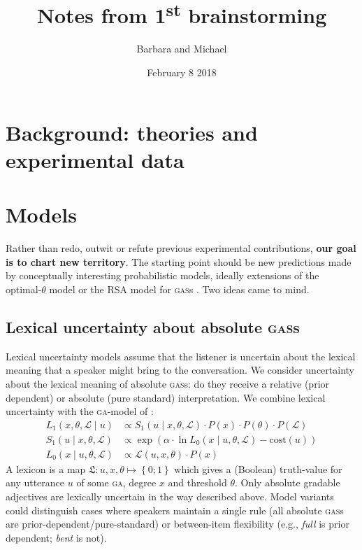 \documentclass[fleqn,reqno,10pt]{article}
\title{Notes from 1\textsuperscript{st} brainstorming}
\author{Barbara and Michael}
\date{February 8 2018}
\newcommand{\acro}[1]{{\relsize{+1}\textsc{#1}}\xspace}
\newcommand{\acros}[1]{{\relsize{+1}\textsc{#1}}{\relsize{-1}s}\xspace}
\newcommand{\ga}{\acro{ga}}    %
\newcommand{\gas}{\acros{gas}} %
\newcommand{\set}[1]{\left\{#1\right\}}
\begin{document}
\maketitle

\section{Background: theories and experimental data}
\label{sec:backgr-theor-exper}

\section{Models}

Rather than redo, outwit or refute previous experimental contributions, \textbf{our goal is to
  chart new territory}. The starting point should be new predictions made by conceptually
interesting probabilistic models, ideally extensions of the optimal-$\theta$ model or the RSA
model for \gas
\citep{QingFranke2014:Meaning-and-Use,QingFranke2014:Gradable-Adject,LassiterGoodman2015:Adjectival-vagu}. Two
ideas came to mind.

\subsection{Lexical uncertainty about absolute \gas}

Lexical uncertainty models
\citep{BergenLevy2012:Thats-what-she-,PottsLassiter2016:Embedded-implic,BergenLevy2014:Pragmatic-Reaso}
assume that the listener is uncertain about the lexical meaning that a speaker might bring to
the conversation. We consider uncertainty about the lexical meaning of absolute \gas: do they
receive a relative (prior dependent) or absolute (pure standard) interpretation. We combine
lexical uncertainty with the \ga-model of \citet{LassiterGoodman2015:Adjectival-vagu}
\citep[exactly what][did too]{TesslerFranke2018:Not-unreasonabl}:
\begin{align}
L_{1}(x, \theta, \mathcal{L} \mid u) &\propto S_{1}(u \mid x, \theta, \mathcal{L}) \cdot P(x) \cdot  P(\theta) \cdot P(\mathcal{L}) \label{eq:L1} \\
S_{1}(u \mid x, \theta, \mathcal{L}) &\propto \exp{(\alpha \cdot \ln {L_{0}(x \mid u, \theta, \mathcal{L})} - \text{cost}(u))} \label{eq:S1}\\
L_{0}(x \mid u, \theta, \mathcal{L}) &\propto \mathcal{L}(u, x, \theta) \cdot P(x) \label{eq:L0}
\end{align}
A lexicon is a map $\mathfrak{L} \colon u,x,\theta \mapsto \set{0;1}$ which gives a (Boolean)
truth-value for any utterance $u$ of some \ga, degree $x$ and threshold $\theta$. Only absolute
gradable adjectives are lexically uncertain in the way described above. Model variants could
distinguish cases where speakers maintain a single rule (all absolute \gas are
prior-dependent/pure-standard) or between-item flexibility (e.g., \emph{full} is prior
dependent; \emph{bent} is not).
\end{document}
